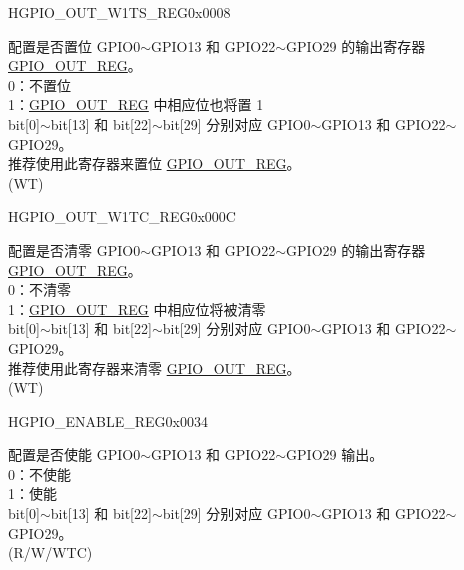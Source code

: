 \begin{register}{H}{GPIO\_OUT\_W1TS\_REG}{0x0008}\label{regdesc:GPIOOUTW1TSREG}
%
\regnewline%
\begin{regdesc}\begin{reglist}
\label{fielddesc:GPIOOUTW1TS}\item [GPIO\_OUT\_W1TS] 配置是否置位 GPIO0$\sim$GPIO13 和 GPIO22$\sim$GPIO29 的输出寄存器 \hyperref[regdesc:GPIOOUTREG]{GPIO\_OUT\_REG}。\\
0：不置位\\
1：\hyperref[regdesc:GPIOOUTREG]{GPIO\_OUT\_REG} 中相应位也将置 1\\
bit[0]$\sim$bit[13] 和 bit[22]$\sim$bit[29] 分别对应 GPIO0$\sim$GPIO13 和 GPIO22$\sim$GPIO29。\\
推荐使用此寄存器来置位 \hyperref[regdesc:GPIOOUTREG]{GPIO\_OUT\_REG}。 \\ (WT)
\end{reglist}\end{regdesc}
\end{register}


\begin{register}{H}{GPIO\_OUT\_W1TC\_REG}{0x000C}\label{regdesc:GPIOOUTW1TCREG}
%
\regnewline%
\begin{regdesc}\begin{reglist}
\label{fielddesc:GPIOOUTW1TC}\item [GPIO\_OUT\_W1TC] 配置是否清零 GPIO0$\sim$GPIO13 和 GPIO22$\sim$GPIO29 的输出寄存器 \hyperref[regdesc:GPIOOUTREG]{GPIO\_OUT\_REG}。\\ 
0：不清零\\
1：\hyperref[regdesc:GPIOOUTREG]{GPIO\_OUT\_REG} 中相应位将被清零\\
bit[0]$\sim$bit[13] 和 bit[22]$\sim$bit[29] 分别对应 GPIO0$\sim$GPIO13 和 GPIO22$\sim$GPIO29。\\
推荐使用此寄存器来清零 \hyperref[regdesc:GPIOOUTREG]{GPIO\_OUT\_REG}。 \\ (WT)
\end{reglist}\end{regdesc}
\end{register}


\begin{register}{H}{GPIO\_ENABLE\_REG}{0x0034}\label{regdesc:GPIOENABLEREG}
%
\regnewline%
\begin{regdesc}\begin{reglist}
\label{fielddesc:GPIOENABLEDATA}\item [GPIO\_ENABLE\_DATA] 配置是否使能 GPIO0$\sim$GPIO13 和 GPIO22$\sim$GPIO29 输出。\\
0：不使能\\
1：使能\\ 
bit[0]$\sim$bit[13] 和 bit[22]$\sim$bit[29] 分别对应 GPIO0$\sim$GPIO13 和 GPIO22$\sim$GPIO29。\\(R/W/WTC)
\end{reglist}\end{regdesc}
\end{register}


